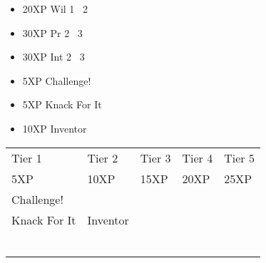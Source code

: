 \documentclass{article}
\begin{document}


\begin{multicols}{2}
\setlength{\columnseprule}{0.3pt}
\begin{itemize}[noitemsep]
\item 20XP Wil 1 \faArrowRight\ 2
\item 30XP Pr 2 \faArrowRight\ 3
\item 30XP Int 2 \faArrowRight\ 3
\item 5XP Challenge!
\item 5XP Knack For It
\item 10XP Inventor
\end{itemize}
\end{multicols}


\vspace*{\fill}

\hfill{}


\pagebreak


\noindent\begin{tabu} to 
\rowfont{\bfseries\sffamily\centering} Tier 1 & Tier 2 & Tier 3 & Tier 4 & Tier 5\\
\rowfont{\small\sffamily\centering} 5XP & 10XP & 15XP & 20XP & 25XP\\
Challenge! \\
Knack For It & Inventor \\
 &  & \\
 &  & & \\
 &  & & & \\
 &  & & & \\
 &  & & & \\
 &  & & & \\

\end{tabu}
\end{document}
